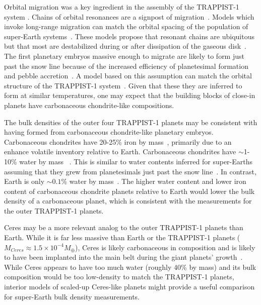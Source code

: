 \documentclass[twocolumn]{aastex63}
\begin{document}
Orbital migration was a key ingredient in the assembly of the TRAPPIST-1 system \citep{Tamayo2017,Ormel2017,Papaloizou2017,MacDonald2018,coleman19}.  Chains of orbital resonances are a signpost of migration~\citep[e.g.]{Cresswell2008}. Models which invoke long-range migration can match the orbital spacing of the population of super-Earth systems~\citep{izidoro17,izidoro19}. These models propose that resonant chains are ubiquitous but that most are destabilized during or after dissipation of the gaseous disk~\citep{terquem07,ogihara09,mcneil10,cossou14}. The first planetary embryos massive enough to migrate are likely to form just past the snow line because of the increased efficiency of planetesimal formation and pebble accretion~\citep{lambrechts14,Ormel2017}. A model based on this assumption can match the orbital structure of the TRAPPIST-1 system~\citep{Schoonenberg2019}. Given that these they are inferred to form at similar temperatures, one may expect that the building blocks of close-in planets have carbonaceous chondrite-like compositions. 

The bulk densities of the outer four TRAPPIST-1 planets may be consistent with having formed from carbonaceous chondrite-like planetary embryos. Carbonaceous chondrites have 20-25\% iron by mass~\citep[see values compiled in][]{lodders98}, primarily due to an enhance volatile inventory relative to Earth.  Carbonaceous chondrites have ${\sim}$1-10\% water by mass~
\citep[and are thought to represent the source population of planetesimals that delivered water to Earth; see][for a review]{meech20}. This is similar to water contents inferred for super-Earths assuming that they grew from planetesimals just past the snow line~\citep{Ormel2017,Schoonenberg2019,bitsch19a,Liu2020}. In contrast, Earth is only ${\sim} 0.1\%$ water by mass~\citep[e.g., ][although uncertainties remain in the core's hydrogen content]{hirschmann06,marty12}. The higher water content and lower iron content of carbonaceous chondrite planets relative to Earth would lower the bulk density of a carbonaceous planet, which is consistent with the measurements for the outer TRAPPIST-1 planets. 

Ceres may be a more relevant analog to the outer TRAPPIST-1 planets than Earth. While it is far less massive than Earth or the TRAPPIST-1 planets ($M_{Ceres} {\approx} 1.5 {\times} 10^{-4} M_\oplus$), Ceres is likely carbonaceous in composition \citep{bland16,mcsween18,marchi19} and is likely to have been implanted into the main belt during the giant planets' growth~\citep{raymond17}. While Ceres appears to have too much water (roughly 40\% by mass) and its bulk composition would be too low-density to match the TRAPPIST-1 planets, interior models of scaled-up Ceres-like planets might provide a useful comparison for super-Earth bulk density measurements. 
\end{document}
